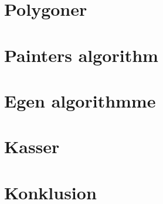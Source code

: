 \documentclass{article}
\begin{document}
\section{Polygoner}


\section{Painters algorithm}

\section{Egen algorithmme}

\section{Kasser}

\section{Konklusion}
\end{document}
